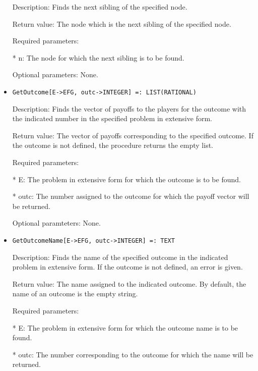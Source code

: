 \begin{itemize}
\bd
\item
[Description:] Finds the next sibling of the specified node.
\item
[Return value:] The node which is the next sibling of the specified 
node.
\item
[Required parameters:]\hfil\null

\bd
\item
[* n:] The node for which the next sibling is to be found.
\ed

\item
[Optional parameters:] None.
\ed

\item
\begin{verbatim}
GetOutcome[E->EFG, outc->INTEGER] =: LIST(RATIONAL)
\end{verbatim}

\bd
\item
[Description:] Finds the vector of payoffs to the players for the 
outcome with the indicated number in the specified problem in extensive
form.
\item
[Return value:] The vector of payoffs corresponding to the specified 
outcome.  If the outcome is not defined, the procedure returns the 
empty list.
\item
[Required parameters:]\hfil\null

\bd
\item
[* E:] The problem in extensive form for which the outcome is to be found.
\item
[* outc:] The number assigned to the outcome for which the payoff 
vector will be returned.
\ed

\item
[Optional paramteters:] None.
\ed

\item
\begin{verbatim}
GetOutcomeName[E->EFG, outc->INTEGER] =: TEXT
\end{verbatim}

\bd

\item
[Description:] Finds the name of the specified outcome in the indicated
problem in extensive form.  If the outcome is not defined, an error is
given.
\item
[Return value:] The name assigned to the indicated outcome.  By default,
the name of an outcome is the empty string.
\item
[Required parameters:]\hfil\null

\bd
\item	  
[* E:] The problem in extensive form for which the outcome name is to
be found.
\item
[* outc:] The number corresponding to the outcome for which the name 
will be returned.
\ed


\end{itemize}
